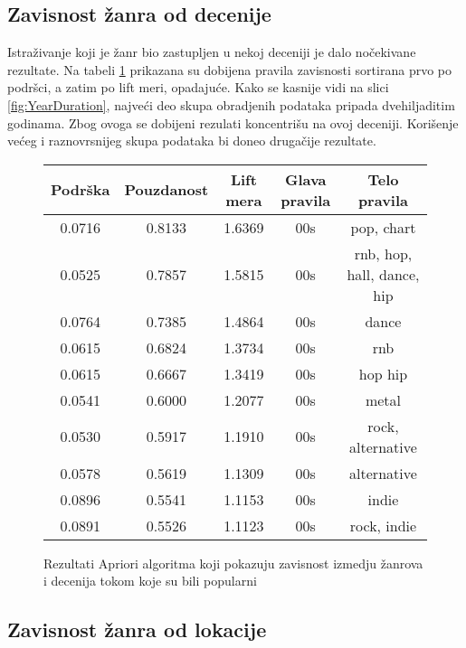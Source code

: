 \subsection{Zavisnost \v{z}anra od decenije}
\label{subsec:AprioriZavisnostZanraOdDecenije}

Istra\v{z}ivanje koji je \v{z}anr bio zastupljen u nekoj deceniji je dalo no\v{c}ekivane rezultate. Na tabeli \ref{fig:aprioriDecade} prikazana su dobijena pravila zavisnosti sortirana prvo po podr\v{s}ci, a zatim po lift meri, opadaju\'c{}e.
Kako se kasnije vidi na slici \ref{fig:YearDuration}, najve\'c{}i deo skupa obradjenih podataka pripada dvehiljaditim godinama. Zbog ovoga se dobijeni rezulati koncentri\v{s}u na ovoj deceniji. Kori\v{s}enje ve\'c{}eg i raznovrsnijeg skupa podataka bi doneo druga\v{c}ije rezultate.

\begin{figure}[H]
    \footnotesize
    \centering
    \begin{tabular}{|c|c|c|c|c|}
        \hline
        Podr\v{s}ka & Pouzdanost & Lift mera & Glava pravila & Telo pravila \\
        \hline
        0.0716 & 0.8133 & 1.6369 & 00s & pop, chart \\
        0.0525 & 0.7857 & 1.5815 & 00s & rnb, hop, hall, dance, hip \\
        0.0764 & 0.7385 & 1.4864 & 00s & dance \\
        0.0615 & 0.6824 & 1.3734 & 00s & rnb \\
        0.0615 & 0.6667 & 1.3419 & 00s & hop hip \\
        0.0541 & 0.6000 & 1.2077 & 00s & metal \\
        0.0530 & 0.5917 & 1.1910 & 00s & rock, alternative \\
        0.0578 & 0.5619 & 1.1309 & 00s & alternative \\
        0.0896 & 0.5541 & 1.1153 & 00s & indie \\
        0.0891 & 0.5526 & 1.1123 & 00s & rock, indie \\
        \hline
    \end{tabular}
    \caption{Rezultati Apriori algoritma koji pokazuju zavisnost izmedju \v{z}anrova i decenija tokom koje su bili popularni}
    \label{fig:aprioriDecade}
\end{figure}


\subsection{Zavisnost \v{z}anra od lokacije}
\label{subsec:AprioriZavisnostZanraOdLokacije}

